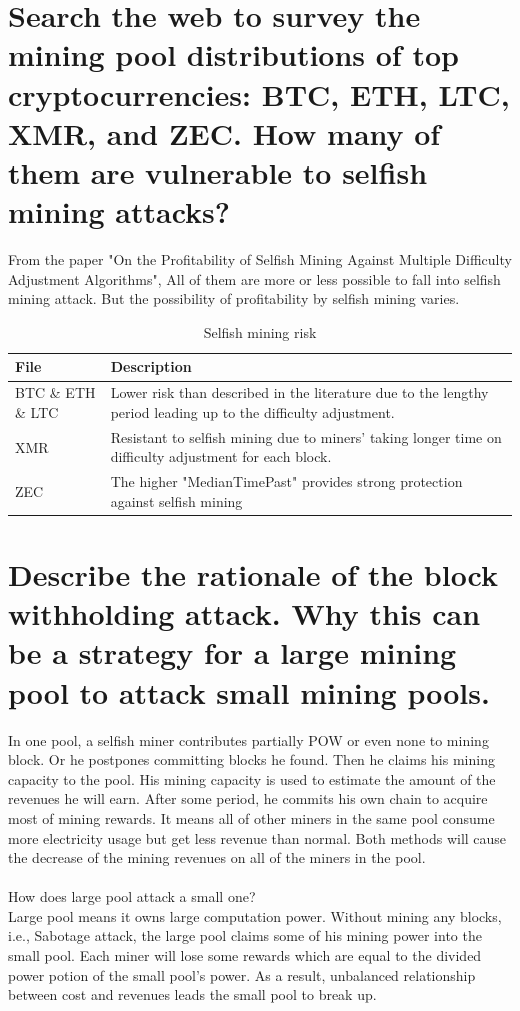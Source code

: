 \documentclass{article}
\begin{document}
\section{Search the web to survey the mining pool distributions of top cryptocurrencies:
BTC, ETH, LTC, XMR, and ZEC. How many of them are vulnerable to selfish mining
attacks?}
From the paper "On the Profitability of Selfish Mining Against
Multiple Difficulty Adjustment Algorithms",
All of them are more or less possible to fall into selfish mining attack.
But the possibility of profitability by selfish mining varies.
\begin{table}[h]
    \small
    \begin{threeparttable}
        \begin{tabular}{|p{4cm}|p{10cm}|}
        \hline
        \textbf{File} &	\textbf{Description} \\
        \hline
        BTC \& ETH \& LTC & Lower risk than described in 
        the literature due to  the lengthy period leading up to the difficulty
        adjustment.\\
        \hline
        XMR & Resistant to selfish mining due to miners' taking longer time 
        on difficulty adjustment
        for each block.\\
        \hline
        ZEC & The higher "MedianTimePast" provides 
        strong protection against selfish mining\\
        \hline
        \end{tabular}
    \end{threeparttable}
    \caption{Selfish mining risk}
    \label{table:smr}
\end{table}
\section{Describe the rationale of the block withholding attack. Why this can be a strategy
for a large mining pool to attack small mining pools.}
In one pool, a selfish miner contributes partially POW or even none to mining block. 
Or he postpones committing blocks he found. 
Then he claims his mining capacity to the pool.
His mining capacity is used to estimate the amount of the revenues he will earn.
After some period, he commits his own chain to acquire most of mining rewards.
It means all of other miners in the same pool consume more electricity usage 
but get less revenue than normal.
Both methods will cause the decrease of the mining revenues on all of the miners in the pool.\\\\
How does large pool attack a small one?\\
Large pool means it owns large computation power. Without mining any blocks, 
i.e., Sabotage attack,
the large pool claims some of his mining power into the small pool.
Each miner will lose some rewards 
which are equal to the divided power potion of the small pool's power.
As a result, unbalanced relationship between cost and revenues leads the small pool to break up.
\end{document}
